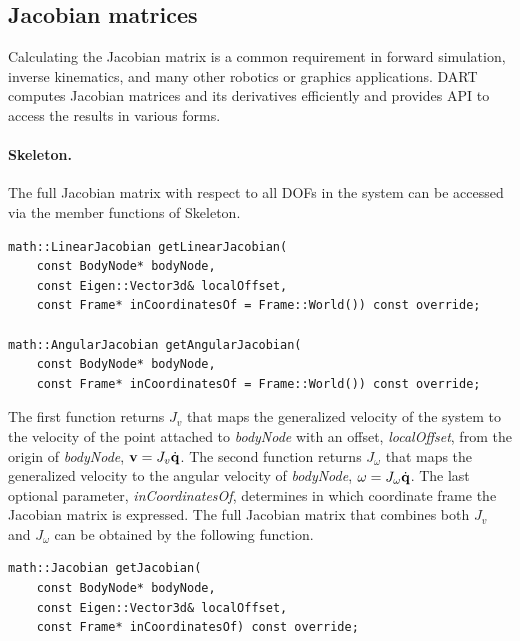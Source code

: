 \subsection{Jacobian matrices}
Calculating the Jacobian matrix is a common requirement in forward simulation, inverse kinematics, and many other robotics or graphics applications. DART computes Jacobian matrices and its derivatives efficiently and provides API to access the results in various forms. 

\paragraph{Skeleton.} The full Jacobian matrix with respect to all DOFs in the system can be accessed via the member functions of Skeleton.

\begin{lstlisting}[caption=Skeleton.h]
math::LinearJacobian getLinearJacobian(
    const BodyNode* bodyNode, 
    const Eigen::Vector3d& localOffset, 
    const Frame* inCoordinatesOf = Frame::World()) const override;

math::AngularJacobian getAngularJacobian(
    const BodyNode* bodyNode, 
    const Frame* inCoordinatesOf = Frame::World()) const override;
\end{lstlisting}

The first function returns $J_v$ that maps the generalized velocity of
the system to the velocity of the point attached to \emph{bodyNode}
with an offset, \emph{localOffset}, from the origin of
\emph{bodyNode}, $\mathbf{v} = J_v \dot{\mathbf{q}}$. The second function
returns $J_{\omega}$ that maps the generalized velocity to the angular
velocity of \emph{bodyNode}, $\omega = J_{\omega}\dot{\mathbf{q}}$. The
last optional parameter, \emph{inCoordinatesOf}, determines in which
coordinate frame the Jacobian matrix is expressed. The full Jacobian
matrix that combines both $J_v$ and $J_{\omega}$ can be obtained by
the following function.

\begin{lstlisting}[caption=Skeleton.h]
math::Jacobian getJacobian(
    const BodyNode* bodyNode, 
    const Eigen::Vector3d& localOffset, 
    const Frame* inCoordinatesOf) const override;
\end{lstlisting}




